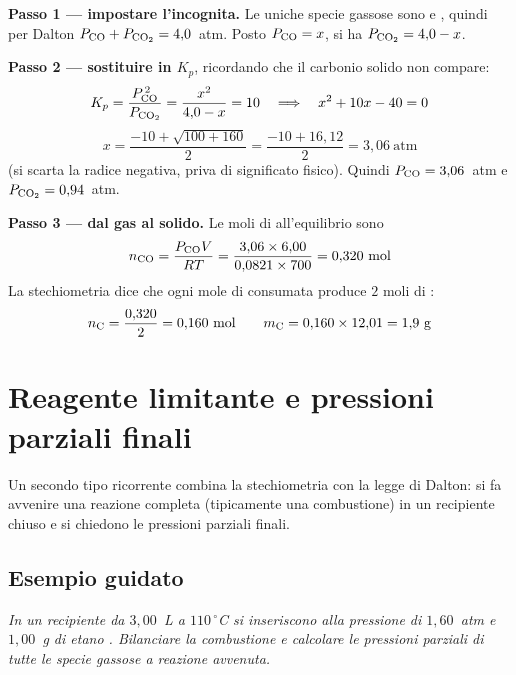 \documentclass[11pt, a4paper, openright]{book}
\begin{document}
\medskip
\noindent\textbf{Passo 1 --- impostare l'incognita.} Le uniche specie gassose sono 
e , quindi per Dalton $P_{\ce{CO}} + P_{\ce{CO2}} = 4{,}0$~atm. Posto
$P_{\ce{CO}} = x$, si ha $P_{\ce{CO2}} = 4{,}0 - x$.

\medskip
\noindent\textbf{Passo 2 --- sostituire in $K_p$}, ricordando che il carbonio solido non
compare:
\begin{equation*}
  K_p = \frac{P_{\ce{CO}}^{\,2}}{P_{\ce{CO2}}} = \frac{x^2}{4{,}0-x} = 10
  \quad\Longrightarrow\quad
  x^2 + 10x - 40 = 0
\end{equation*}
\begin{equation*}
  x = \frac{-10 + \sqrt{100+160}}{2} = \frac{-10+16{,}12}{2} = 3{,}06 \ \text{atm}
\end{equation*}
(si scarta la radice negativa, priva di significato fisico). Quindi
$P_{\ce{CO}} = 3{,}06$~atm e $P_{\ce{CO2}} = 0{,}94$~atm.

\medskip
\noindent\textbf{Passo 3 --- dal gas al solido.} Le moli di  all'equilibrio sono
\begin{equation*}
  n_{\ce{CO}} = \frac{P_{\ce{CO}} V}{RT}
              = \frac{3{,}06 \times 6{,}00}{0{,}0821 \times 700} = 0{,}320 \ \text{mol}
\end{equation*}
La stechiometria dice che ogni mole di  consumata produce $2$ moli di :
\begin{equation*}
  n_{\ce{C}} = \frac{0{,}320}{2} = 0{,}160 \ \text{mol}
  \qquad
  m_{\ce{C}} = 0{,}160 \times 12{,}01 = 1{,}9 \ \text{g}
\end{equation*}


\section{Reagente limitante e pressioni parziali finali}

Un secondo tipo ricorrente combina la stechiometria con la legge di Dalton: si fa avvenire
una reazione completa (tipicamente una combustione) in un recipiente chiuso e si chiedono
le pressioni parziali finali.

\subsection{Esempio guidato}

\emph{In un recipiente da $3{,}00$~L a $110\,^\circ$C si inseriscono  alla pressione
di $1{,}60$~atm e $1{,}00$~g di etano . Bilanciare la combustione e calcolare le
pressioni parziali di tutte le specie gassose a reazione avvenuta.}
\end{document}
